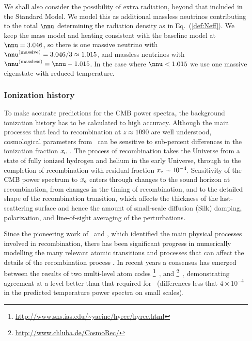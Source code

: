 We shall also consider the possibility of extra radiation, beyond that
included in the Standard Model. We model this as
additional massless neutrinos contributing to the total $\nnu$
determining the radiation density as in Eq.~(\ref{def:Neff}).  We keep
the mass model and heating consistent with the baseline model at
$\nnu=3.046$, so there is one massive neutrino with $\nnu^{(\rm
  massive)}=3.046/3 \approx 1.015$, and massless neutrinos with
$\nnu^{(\rm massless)}=\nnu-1.015$.  In the case where $\nnu < 1.015$
we use one massive eigenstate with reduced temperature.


\subsubsection{Ionization history}

To make accurate predictions for the CMB power spectra, the background
ionization history has to be calculated to high accuracy.  Although
the main processes that lead to recombination at $z\approx 1090$ are well
understood, cosmological parameters from \planck\ can be sensitive to
sub-percent differences in the ionization fraction
$x_{\rm e}$ \citep{Hu:1995fqa,Lewis:2006ym,RubinoMartin:2009ry,Shaw:2011ez}.
The process of recombination takes the Universe from a state of fully
ionized hydrogen and helium in the early Universe, through to the
completion of recombination with residual fraction $x_{\rm e} \sim 10^{-4}$.
Sensitivity of the CMB power spectrum to $x_{\rm e}$ enters through changes
to the sound horizon at recombination, from changes in the timing of
recombination, and to the detailed shape of the recombination transition,
which affects the thickness of the last-scattering surface and hence the
amount of small-scale diffusion (Silk) damping, polarization, and line-of-sight
averaging of the perturbations.

Since the pioneering work of~\cite{Peebles:68} and \cite{Zeldovich:69},
which identified the main physical processes involved in recombination,
there has been significant progress in numerically modelling the many
relevant atomic transitions and processes that can affect the details
of the recombination process \citep{Hu:1995fqa,Seager:1999km,Wong:2007ym,Hirata:2007sp,
Switzer:2007sn,RubinoMartin:2009ry,Grin:2009ik,Chluba:2010ca,AliHaimoud:2010ym,AliHaimoud:2010dx}.
In recent years a consensus has emerged between the results of two
multi-level atom codes
\HYREC\footnote{\url{http://www.sns.ias.edu/~yacine/hyrec/hyrec.html}}~\citep{Switzer:2007sn,Hirata:2008ny,AliHaimoud:2010dx},
and
\COSMOREC\footnote{\url{http://www.chluba.de/CosmoRec/}}~\citep{Chluba:2010fy,Chluba:2010ca},
demonstrating agreement at a level better than that required for
\planck\ (differences less that $4\times 10^{-4}$ in the predicted
temperature power spectra on small scales).

